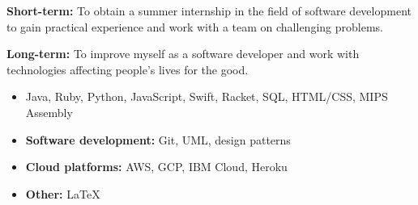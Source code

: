 \documentclass[10pt,a4paper,ragged2e]{altacv}
\begin{document}

\begin{fullwidth}
\makecvheader
\end{fullwidth}


\textbf{Short-term:} To obtain a summer internship in the field of software development to gain practical experience and work with a team on challenging problems.

\textbf{Long-term:} To improve myself as a software developer and work with technologies affecting people's lives for the good. 



\begin{itemize}
\item Java, Ruby, Python, JavaScript, Swift, Racket, SQL, HTML/CSS, MIPS Assembly
\end{itemize}

\begin{itemize}
\item \textbf{Software development: }Git, UML, design patterns
\item \textbf{Cloud platforms: }AWS, GCP, IBM Cloud, Heroku
\item \textbf{Other: }\LaTeX
\end{itemize}
\end{document}
